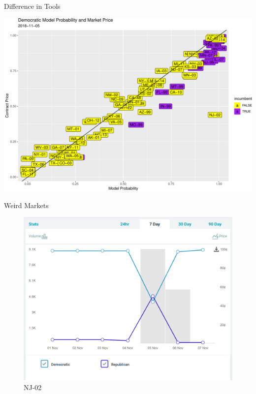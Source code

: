 \documentclass[ignorenonframetext,]{beamer}
\begin{document}
\begin{frame}{Difference in Tools}

\includegraphics{markets_models_files/figure-beamer/nov05 label-1.pdf}

\end{frame}

\begin{frame}{Weird Markets}

\begin{figure}
\centering
\includegraphics{NJ-02.png}
\caption{NJ-02}
\end{figure}

\end{frame}
\end{document}
